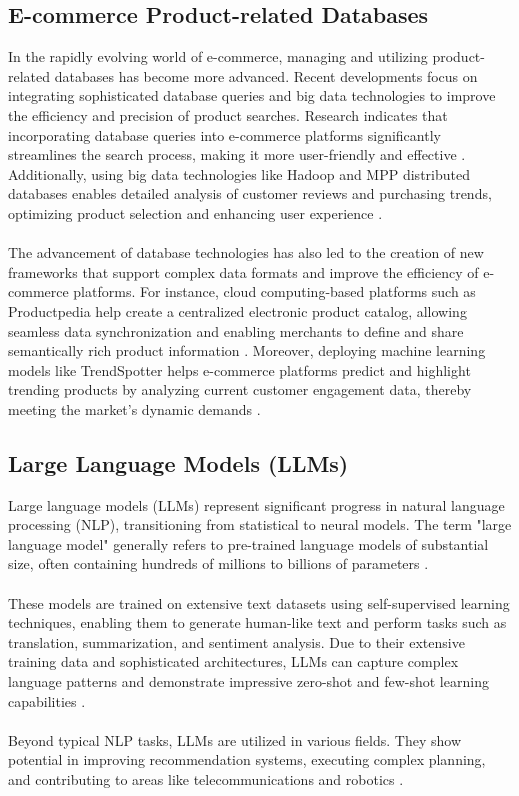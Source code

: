 \subsection*{E-commerce Product-related Databases}
In the rapidly evolving world of e-commerce, managing and utilizing product-related databases has become more advanced. Recent developments focus on integrating sophisticated database queries and big data technologies to improve the efficiency and precision of product searches. Research indicates that incorporating database queries into e-commerce platforms significantly streamlines the search process, making it more user-friendly and effective \cite{Muntjir2016}. Additionally, using big data technologies like Hadoop and MPP distributed databases enables detailed analysis of customer reviews and purchasing trends, optimizing product selection and enhancing user experience \cite{Liang_2020}.
\\\\
The advancement of database technologies has also led to the creation of new frameworks that support complex data formats and improve the efficiency of e-commerce platforms. For instance, cloud computing-based platforms such as Productpedia help create a centralized electronic product catalog, allowing seamless data synchronization and enabling merchants to define and share semantically rich product information \cite{10.1007/978-3-319-20895-4_34}. Moreover, deploying machine learning models like TrendSpotter helps e-commerce platforms predict and highlight trending products by analyzing current customer engagement data, thereby meeting the market's dynamic demands \cite{10.1145/3583780.3615503}.

\subsection*{Large Language Models (LLMs)} %
Large language models (LLMs) represent significant progress in natural language processing (NLP), transitioning from statistical to neural models. The term "large language model" generally refers to pre-trained language models of substantial size, often containing hundreds of millions to billions of parameters \cite{zhao2023survey}.
\\\\
These models are trained on extensive text datasets using self-supervised learning techniques, enabling them to generate human-like text and perform tasks such as translation, summarization, and sentiment analysis. Due to their extensive training data and sophisticated architectures, LLMs can capture complex language patterns and demonstrate impressive zero-shot and few-shot learning capabilities \cite{naveed2024comprehensive}.
\\\\
Beyond typical NLP tasks, LLMs are utilized in various fields. They show potential in improving recommendation systems, executing complex planning, and contributing to areas like telecommunications and robotics \cite{10305960} \cite{fan2023fatellm}.

